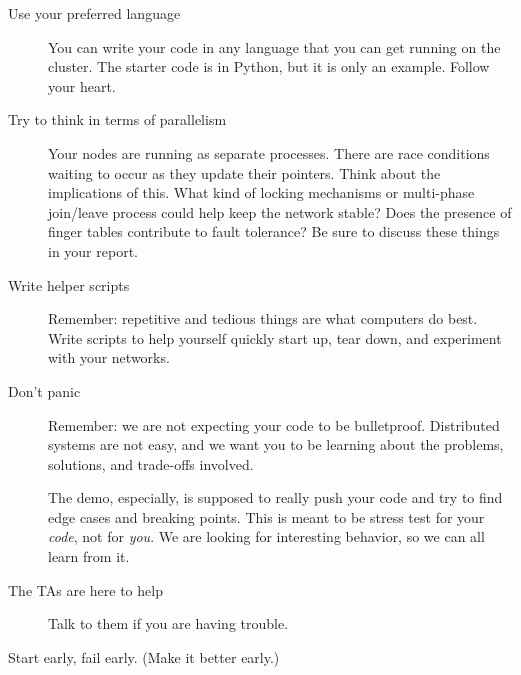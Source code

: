 \documentclass[]{article}
\begin{document}
\begin{description}

    \item[Use your preferred language]

        You can write your code in any language that you can get running on the cluster.
        The starter code is in Python, but it is only an example.
        Follow your heart.

    \item[Try to think in terms of parallelism]

        Your nodes are running as separate processes.
        There are race conditions waiting to occur as they update their pointers.
        Think about the implications of this.
        What kind of locking mechanisms or multi-phase join/leave process
        could help keep the network stable?
        Does the presence of finger tables contribute to fault tolerance?
        Be sure to discuss these things in your report.

    \item[Write helper scripts]

        Remember: repetitive and tedious things are what computers do best.
        Write scripts to help yourself quickly start up, tear down, and experiment with your networks.

    \item[Don't panic]

        Remember: we are not expecting your code to be bulletproof.
        Distributed systems are not easy,
        and we want you to be learning about the problems, solutions, and trade-offs involved.

        The demo, especially, is supposed to really push your code and try to find edge cases and breaking points.
        This is meant to be stress test for your \textit{code}, not for \textit{you}.
        We are looking for interesting behavior, so we can all learn from it.

    \item[The TAs are here to help]
        Talk to them if you are having trouble.

    \item[Start early, fail early. (Make it better early.)]

\end{description}


\printbibliography
\end{document}

